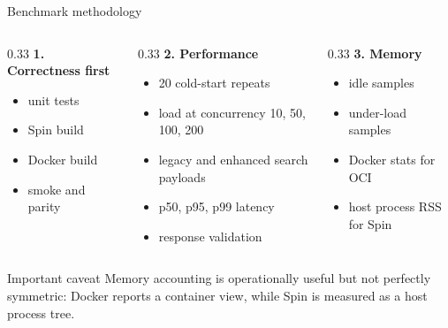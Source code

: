 \documentclass[aspectratio=169,10pt]{beamer}
\begin{document}
\begin{frame}{Benchmark methodology}
  \begin{columns}[T,onlytextwidth]
    \begin{column}{0.33\linewidth}
      \textbf{1. Correctness first}
      \begin{itemize}
        \item unit tests
        \item Spin build
        \item Docker build
        \item smoke and parity
      \end{itemize}
    \end{column}
    \begin{column}{0.33\linewidth}
      \textbf{2. Performance}
      \begin{itemize}
        \item 20 cold-start repeats
        \item load at concurrency 10, 50, 100, 200
        \item legacy and enhanced search payloads
        \item p50, p95, p99 latency
        \item response validation
      \end{itemize}
    \end{column}
    \begin{column}{0.33\linewidth}
      \textbf{3. Memory}
      \begin{itemize}
        \item idle samples
        \item under-load samples
        \item Docker stats for OCI
        \item host process RSS for Spin
      \end{itemize}
    \end{column}
  \end{columns}

  \vspace{4mm}
  \begin{block}{Important caveat}
    Memory accounting is operationally useful but not perfectly symmetric: Docker reports a container view, while Spin is measured as a host process tree.
  \end{block}
\end{frame}
\end{document}
